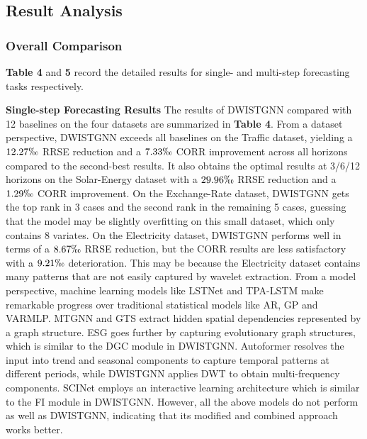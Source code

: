 \documentclass[final,12pt]{elsarticle}
\begin{document}
\subsection{Result Analysis}
\label{subsec-5.2}


\subsubsection{Overall Comparison}
\label{subsubsec-5.2.1}


\textbf{Table 4} and \textbf{5} record the detailed results 
for single- and multi-step forecasting tasks respectively.

\noindent \textbf{Single-step Forecasting Results}
The results of DWISTGNN compared with 12 baselines 
on the four datasets are summarized in \textbf{Table 4}.
From a dataset perspective, 
DWISTGNN exceeds all baselines on the Traffic dataset, 
yielding a $12.27\permil$ RRSE reduction and a $7.33\permil$ CORR improvement 
across all horizons compared to the second-best results.
It also obtains the optimal results at 3/6/12 horizons on the Solar-Energy dataset 
with a $29.96\permil$ RRSE reduction and a $1.29\permil$ CORR improvement.
On the Exchange-Rate dataset, DWISTGNN gets the top rank 
in 3 cases and the second rank in the remaining 5 cases, 
guessing that the model may be slightly overfitting 
on this small dataset, which only contains 8 variates.
On the Electricity dataset, DWISTGNN performs well in terms of a $8.67\permil$ RRSE reduction, 
but the CORR results are less satisfactory with a $9.21\permil$ deterioration.
This may be because 
the Electricity dataset contains many patterns 
that are not easily captured by wavelet extraction.
From a model perspective, 
machine learning models like LSTNet and TPA-LSTM 
make remarkable progress over traditional statistical models 
like AR, GP and VARMLP.
MTGNN and GTS extract hidden spatial dependencies 
represented by a graph structure.
ESG goes further by capturing evolutionary graph structures, 
which is similar to the DGC module in DWISTGNN.
Autoformer resolves the input into trend and seasonal components 
to capture temporal patterns at different periods, 
while DWISTGNN applies DWT to obtain multi-frequency components.
SCINet employs an interactive learning architecture 
which is similar to the FI module in DWISTGNN.
However, all the above models do not perform as well as DWISTGNN, 
indicating that its modified and combined approach works better.
\end{document}
